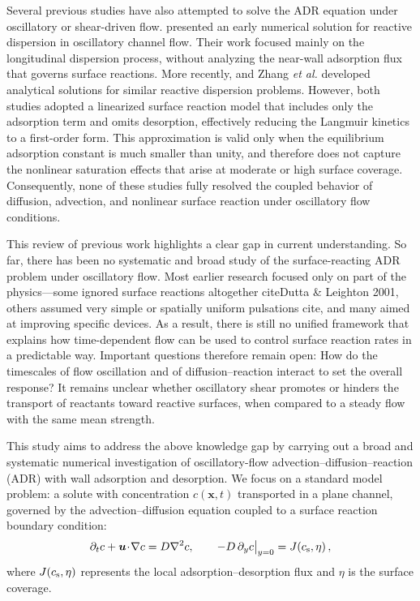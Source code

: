 \documentclass[lineno]{JFM-FLM_Au}
\begin{document}
Several previous studies have also attempted to solve the ADR equation under oscillatory or shear-driven flow. 
\cite{mazumder1992effect} presented an early numerical solution for reactive dispersion in oscillatory channel flow. 
Their work focused mainly on the longitudinal dispersion process, 
without analyzing the near-wall adsorption flux that governs surface reactions. 
More recently, \cite{Jiang_Zeng_Fu_Wu_2022} and Zhang \textit{et al.} \cite{Zhang2017} 
developed analytical solutions for similar reactive dispersion problems. 
However, both studies adopted a linearized surface reaction model that includes only the adsorption term 
and omits desorption, effectively reducing the Langmuir kinetics to a first-order form. 
This approximation is valid only when the equilibrium adsorption constant is much smaller than unity, 
and therefore does not capture the nonlinear saturation effects that arise at moderate or high surface coverage. 
Consequently, none of these studies fully resolved the coupled behavior of diffusion, advection, and nonlinear surface reaction under oscillatory flow conditions.


This review of previous work highlights a clear gap in current understanding.
So far, there has been no systematic and broad study of the surface-reacting ADR problem under oscillatory flow.
Most earlier research focused only on part of the physics—some ignored surface reactions altogether cite{Dutta \& Leighton 2001}, others assumed very simple or spatially uniform pulsations cite{}, and many aimed at improving specific devices\cite{}.
As a result, there is still no unified framework that explains how time-dependent flow can be used to control surface reaction rates in a predictable way.
Important questions therefore remain open:
How do the timescales of flow oscillation and of diffusion–reaction interact to set the overall response?
It remains unclear whether oscillatory shear promotes or hinders the transport of reactants toward reactive surfaces, when compared to a steady flow with the same mean strength.

This study aims to address the above knowledge gap by carrying out a broad and systematic numerical investigation of oscillatory-flow advection–diffusion–reaction (ADR) with wall adsorption and desorption. 
We focus on a standard model problem: a solute with concentration $c(\boldsymbol{x},t)$ transported in a plane channel, governed by the advection–diffusion equation coupled to a surface reaction boundary condition:
\begin{equation}
\partial_t c + \boldsymbol{u}\!\cdot\!\nabla c = D\nabla^2 c,
\qquad 
-D\,\partial_y c\big|_{y=0} = J\!\left(c_{\rm s},\eta\right),
\label{eq:ADR_dim}
\end{equation}
where $J(c_{\rm s},\eta)$ represents the local adsorption–desorption flux and $\eta$ is the surface coverage.
\end{document}
